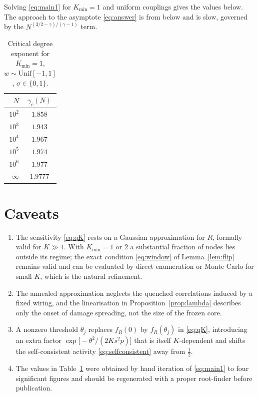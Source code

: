 \documentclass[11pt]{article}
\theoremstyle{remark}
\newcommand{\Kmin}{K_{\mathrm{min}}}
\begin{document}
Solving \eqref{eq:main1} for $\Kmin=1$ and uniform couplings gives the values
below. The approach to the asymptote \eqref{eq:answer} is from below and is slow,
governed by the $N^{(3/2-\gamma)/(\gamma-1)}$ term.

\begin{table}[h]
\centering
\begin{tabular}{rc}
\toprule
$N$ & $\gamma_c(N)$ \\
\midrule
$10^{2}$   & $1.858$ \\
$10^{3}$   & $1.943$ \\
$10^{4}$   & $1.967$ \\
$10^{5}$   & $1.974$ \\
$10^{6}$   & $1.977$ \\
$\infty$   & $1.9777$ \\
\bottomrule
\end{tabular}
\caption{Critical degree exponent for $\Kmin=1$, $w\sim\mathrm{Unif}[-1,1]$,
$\sigma\in\{0,1\}$.}
\label{tab:gamma}
\end{table}

\section{Caveats}

\begin{enumerate}
\item The sensitivity \eqref{eq:qK} rests on a Gaussian approximation for $R$,
formally valid for $K\gg1$. With $\Kmin=1$ or $2$ a substantial fraction of nodes
lies outside its regime; the exact condition \eqref{eq:window} of
Lemma~\ref{lem:flip} remains valid and can be evaluated by direct enumeration or
Monte Carlo for small $K$, which is the natural refinement.
\item The annealed approximation neglects the quenched correlations induced by a
fixed wiring, and the linearisation in Proposition~\ref{prop:lambda} describes
only the onset of damage spreading, not the size of the frozen core.
\item A nonzero threshold $\theta_j$ replaces $f_R(0)$ by $f_R(\theta_j)$ in
\eqref{eq:qK}, introducing an extra factor $\exp\!\big[-\theta^2/(2Ks^2p)\big]$
that is itself $K$-dependent and shifts the self-consistent activity
\eqref{eq:selfconsistent} away from $\tfrac12$.
\item The values in Table~\ref{tab:gamma} were obtained by hand iteration of
\eqref{eq:main1} to four significant figures and should be regenerated with a
proper root-finder before publication.
\end{enumerate}
\end{document}
